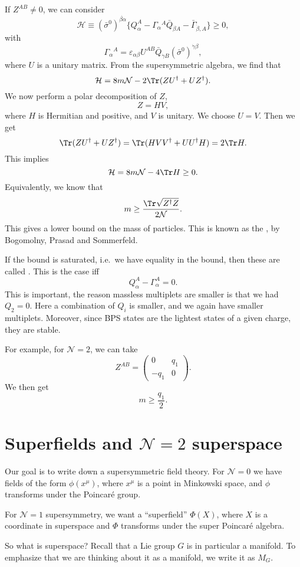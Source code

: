 \documentclass[a4paper]{article}
\begin{document}
If $Z^{AB} \not= 0$, we can consider
\[
  \mathcal{H} \equiv (\bar{\sigma}^0)^{\dot{\beta \alpha}} \{Q_\alpha^A - \Gamma_\alpha\!^A \bar{Q}_{\dot{\beta} A} - \bar{\Gamma}_{\dot{\beta}, A}\} \geq 0,
\]
with
\[
  \Gamma_\alpha\!^A = \varepsilon_{\alpha\beta} U^{AB} \bar{Q}_{\dot{\gamma} B} (\bar{\sigma}^0)^{\dot{\gamma} \beta},
\]
where $U$ is a unitary matrix. From the supersymmetric algebra, we find that
\[
  \mathcal{H} = 8m\mathcal{N} - 2 \Tr(ZU^\dagger + U Z^\dagger).
\]
We now perform a polar decomposition of $Z$,
\[
  Z = HV,
\]
where $H$ is Hermitian and positive, and $V$ is unitary. We choose $U = V$. Then we get
\[
  \Tr(ZU^\dagger + UZ^\dagger) = \Tr (HVV^\dagger + UU^\dagger H) = 2 \Tr H.
\]
This implies
\[
  \mathcal{H} = 8m\mathcal{N} - 4 \Tr H \geq 0.
\]
Equivalently, we know that
\[
  m \geq \frac{\Tr \sqrt{Z^\dagger Z}}{2\mathcal{N}}.
\]
This gives a lower bound on the mass of particles. This is known as the , by Bogomolny, Prasad and Sommerfeld.

If the bound is saturated, i.e.\ we have equality in the bound, then these are called . This is the case iff
\[
  Q_\alpha^A - \Gamma_\alpha^A = 0.
\]
This is important, the reason massless multiplets are smaller is that we had $Q_2 = 0$. Here a combination of $Q_i$ is smaller, and we again have smaller multiplets. Moreover, since BPS states are the lightest states of a given charge, they are stable.

For example, for $\mathcal{N} = 2$, we can take
\[
  Z^{AB} =
  \begin{pmatrix}
    0 & q_1\\
    -q_1 & 0
  \end{pmatrix}.
\]
We then get
\[
  m \geq \frac{q_1}{2}.
\]
\section{Superfields and \texorpdfstring{$\mathcal{N} = 2$}{N = 1} superspace}
Our goal is to write down a supersymmetric field theory. For $\mathcal{N} = 0$ we have fields of the form $\phi(x^\mu)$, where $x^\mu$ is a point in Minkowski space, and $\phi$ transforms under the Poincar\'e group.

For $\mathcal{N} = 1$ supersymmetry, we want a ``superfield'' $\Phi(X)$, where $X$ is a coordinate in superspace and $\Phi$ transforms under the super Poincar\'e algebra.

So what is superspace? Recall that a Lie group $G$ is in particular a manifold. To emphasize that we are thinking about it as a manifold, we write it as $M_G$.
\end{document}
